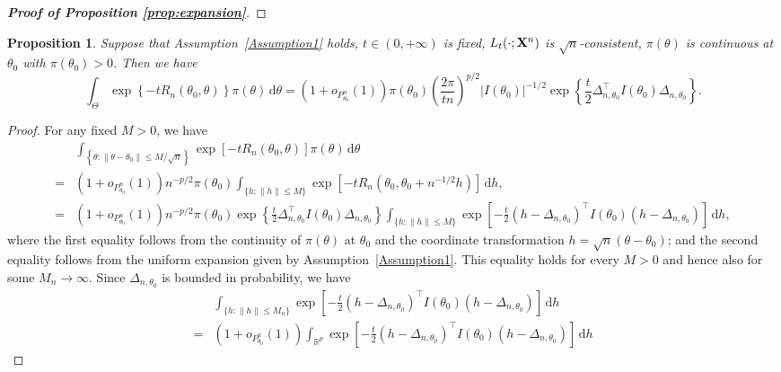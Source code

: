 \documentclass[11pt]{article}
\theoremstyle{plain}
\newtheorem{proposition}{\quad\quad Proposition}
\theoremstyle{definition}
\theoremstyle{remark}
\begin{document}
\begin{appendices}
\begin{proof}[\textbf{Proof of Proposition \ref{prop:expansion}}]
    \end{proof}


\begin{proposition}
    Suppose that Assumption~\ref{Assumption1} holds, $t\in (0,+\infty)$ is fixed,  $L_{t}(\cdot;\BX^{n})$ is $\sqrt{n}$-consistent, $\pi(\theta)$ is continuous at $\theta_0$ with $\pi(\theta_0)>0$.
        Then we have
$$
    \int_{\Theta}
    \exp\left\{-t R_n(\theta_0, \theta) \right\} \pi(\theta)
\, \mathrm d \theta
    =
    (1+o_{P^n_{\theta_0}}(1))
    \pi(\theta_0)
    \left(\frac{2\pi}{t n}\right)^{{p}/{2}}
    |I(\theta_0)|^{-{1}/{2}} 
    \exp
    \left\{ 
        \frac{t}{2}\Delta_{n,\theta_0}^\top  I({\theta_0})\Delta_{n,\theta_0}
\right\}
    .
$$
    \label{prop:2019rock1}
\end{proposition}
\begin{proof}
        For any fixed $M>0$, we have
\begin{align*}
& \int_{\left\{ \theta: \|\theta - \theta_0\| \leq M/\sqrt n \right\}}
\exp[-t R_n(\theta_0, \theta)] \pi(\theta)
\, \mathrm d \theta
    \\
    =
    &
    (1+o_{P^n_{\theta_0}}(1))
    n^{-p/2} \pi(\theta_0)
    \int_{\{h:\|h\|\leq M\}}\exp\left[ - t R_n(\theta_0,\theta_0+n^{-1/2}h)\right] \, \mathrm d h
    ,
    \\
    =&
    (1+o_{P^n_{\theta_0}}(1))
    n^{-p/2}\pi(\theta_0)
    \exp\left\{ 
        \frac{t}{2}\Delta_{n,\theta_0}^\top  I({\theta_0})\Delta_{n,\theta_0}
    \right\}
    \int_{\{h:\|h\|\leq M\}}\exp\left[ -\frac{t}{2}(h-\Delta_{n,\theta_0})^\top  I({\theta_0})(h-\Delta_{n,\theta_0})\right] \, \mathrm dh
,
\end{align*}
where the first equality follows from the continuity of $\pi(\theta)$ at $\theta_0$ and the coordinate transformation $h=\sqrt{n}(\theta-\theta_0)$;
and the second equality follows from the uniform expansion given by Assumption~\ref{Assumption1}.
This equality holds for every $M>0$ and hence also for some $M_n\to \infty$.
Since $\Delta_{n,\theta_0}$ is bounded in probability, we have
        $$
            \begin{aligned}
                & \int_{\{h:\|h\|\leq M_n\}}\exp\left[ -\frac{t}{2}(h-\Delta_{n,\theta_0})^\top  I({\theta_0})(h-\Delta_{n,\theta_0})\right] \, \mathrm dh
                \\
                =&
                (1+o_{P^n_{\theta_0}}(1))
                \int_{\mathbb{R}^p}\exp\left[ -\frac{t}{2}(h-\Delta_{n,\theta_0})^\top  I({\theta_0})(h-\Delta_{n,\theta_0})\right] \, \mathrm dh

\end{aligned}$$
\end{proof}
\end{appendices}
\end{document}
